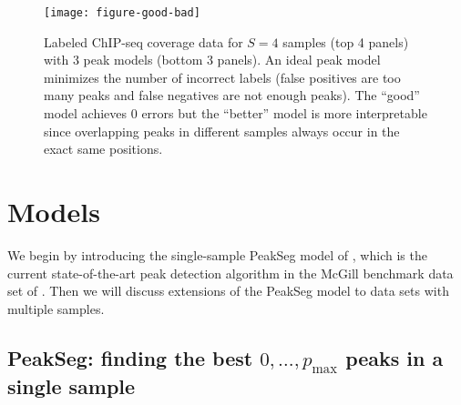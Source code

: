 \documentclass{article} %
\begin{document}
\begin{figure}[b!]
  \centering
  \texttt{[image: figure-good-bad]}
  \vskip -0.5cm
  \caption{Labeled ChIP-seq coverage data for $S=4$ samples (top 4
    panels) with 3 peak models (bottom 3 panels).
    An ideal peak model minimizes the number of incorrect labels
    (false positives are too many peaks and false negatives are not
    enough peaks). The ``good'' model achieves 0 errors but the
    ``better'' model is more interpretable since overlapping peaks in
    different samples always occur in the exact same positions.}
  \label{fig:good-bad}
\end{figure}

\section{Models}

We begin by introducing the single-sample PeakSeg model of
\citet{HOCKING-PeakSeg}, which is the current state-of-the-art peak
detection algorithm in the McGill benchmark data set of
\citet{hocking2014visual}. Then we will discuss extensions of the
PeakSeg model to data sets with multiple samples.

\subsection{PeakSeg: finding the best $0,\dots,p_{\text{max}}$ peaks
  in a single sample}
\end{document}
